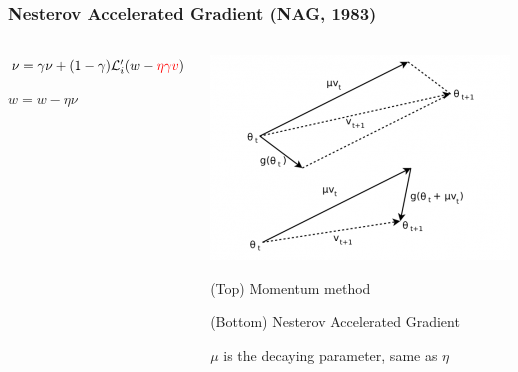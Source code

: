 \documentclass[fullscreen=true, bookmarks=true, hyperref={pdfencoding=unicode}]{beamer}
\begin{document}
\begin{frame}
\frametitle{Nesterov Accelerated Gradient (NAG, 1983)}

   \begin{columns}
     \begin{column}{0.45\paperwidth}
     $\nu = \gamma \nu + (1 - \gamma) \mathcal{L}_i^\prime (w - {\color{red}\eta \gamma v})$

     $w = w - \eta \nu$
     \end{column}
     \begin{column}{0.45\paperwidth}
     \centering
     \includegraphics[keepaspectratio, width=0.3\paperwidth]{nag_vs_mom.png}
     
     {\small (Top) Momentum method

     (Bottom) Nesterov Accelerated Gradient

     $\mu$ is the decaying parameter, same as $\eta$}
     \end{column}
   \end{columns}


\end{frame}
\end{document}
